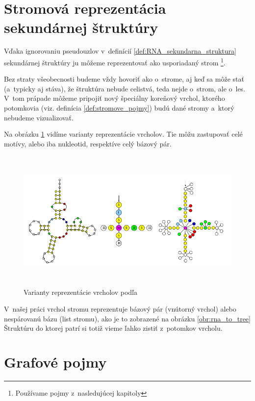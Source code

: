 \section{Stromová reprezentácia sekundárnej štruktúry}

Vďaka ignorovaniu pseudouzlov v~definícií \ref{def:RNA_sekundarna_struktura} sekundárnej
štruktúry ju môžeme reprezentovať ako usporiadaný strom
\footnote{Používame pojmy z~nasledujúcej kapitoly }.

Bez straty všeobecnosti budeme vždy hovoriť ako o~strome, aj keď sa môže stať
(a~typicky aj stáva), že štruktúra nebude celistvá, teda nejde o~strom, ale o~les.
V~tom prápade môžeme pripojiť nový špeciálny koreňový vrchol, ktorého potomkovia
(viz. definícia \ref{def:stromove_pojmy}) budú dané stromy a~ktorý nebudeme vizualizovať.

Na obrázku \ref{obr:RNA_stromova_reprezentacia} vidíme varianty reprezentácie vrcholov.
Tie môžu zastupovať celé motívy, alebo iba nukleotid, respektíve celý bázový pár.

\begin{figure}
  \centering
  \includegraphics[width=130mm, height=70mm]{../img/stromova_reprezentacia_rna}
  \caption{Varianty reprezentácie vrcholov podľa }
  \label{obr:RNA_stromova_reprezentacia}
\end{figure}

V~našej práci vrchol stromu reprezentuje bázový pár (vnútorný vrchol)
alebo nespárovanú bázu (list stromu), ako je to zobrazené na obrázku \ref{obr:rna_to_tree}
Štruktúru do ktorej patrí si totiž vieme ľahko zistiť z~potomkov vrcholu.






\section{Grafové pojmy}
\label{kap:grafy}

